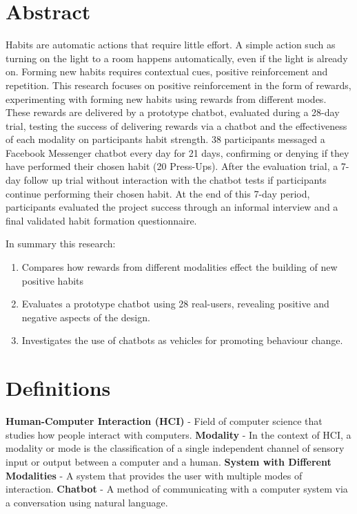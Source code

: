 
\section*{Abstract}

Habits are automatic actions that require little effort. A simple action such as turning on the light to a room happens automatically, even if the light is already on. Forming new habits requires contextual cues, positive reinforcement and repetition. This research focuses on positive reinforcement in the form of rewards, experimenting with forming new habits using rewards from different modes. These rewards are delivered by a prototype chatbot, evaluated during a 28-day trial, testing the success of delivering rewards via a chatbot and the effectiveness of each modality on participants habit strength. 38 participants messaged a Facebook Messenger chatbot every day for 21 days, confirming or denying if they have performed their chosen habit (20 Press-Ups). After the evaluation trial, a 7-day follow up trial without interaction with the chatbot tests if participants continue performing their chosen habit. At the end of this 7-day period, participants evaluated the project success through an informal interview and a final validated habit formation questionnaire.

In summary this research:

\begin{enumerate}
  \item Compares how rewards from different modalities effect the building of new positive habits
  \item Evaluates a prototype chatbot using 28 real-users, revealing positive and negative aspects of the design.
  \item Investigates the use of chatbots as vehicles for promoting behaviour change.
\end{enumerate}
\newpage

\section*{Definitions}

\textbf{Human-Computer Interaction (HCI)} - Field of computer science that studies how people interact with computers.\newline
\newline
\textbf{Modality} - In the context of HCI, a modality or mode is the classification of a single independent channel of sensory input or output between a computer and a human.\newline
\newline
\textbf{System with Different Modalities} - A system that provides the user with multiple modes of interaction.\newline
\newline
\textbf{Chatbot} - A method of communicating with a computer system via a conversation using natural language.

\newpage
